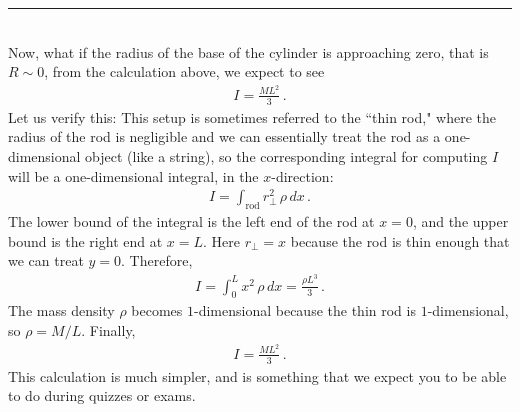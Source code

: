 \documentclass[11pt]{article}
\begin{document}
\noindent\rule{8cm}{0.4pt}\\
Now, what if the radius of the base of the cylinder is approaching zero, that is $R \sim 0$, from the calculation above, we expect to see
\begin{align*}
I = \frac{ML^2}{3}\,.
\end{align*}
Let us verify this: This setup is sometimes referred to the ``thin rod," where the radius of the rod is negligible and we can essentially treat the rod as a one-dimensional object (like a string), so the corresponding integral for computing $I$ will be a one-dimensional integral, in the $x$-direction:
\begin{align*}
I = \int_{\text{rod}} r_{\perp}^2 \,\rho\, dx\,.
\end{align*}
The lower bound of the integral is the left end of the rod at $x = 0$, and the upper bound is the right end at $x = L$. Here $r_\perp = x$ because the rod is thin enough that we can treat $y = 0$. Therefore, 
\begin{align*}
I= \int_{0}^L x^2 \, \rho \,  dx = \frac{\rho L^3}{3}\,.
\end{align*}
The mass density $\rho$ becomes $1$-dimensional because the thin rod is $1$-dimensional, so $\rho = M/L$. Finally, 
\begin{align*}
I = \frac{ML^2}{3}\,.
\end{align*}
This calculation is much simpler, and is something that we expect you to be able to do during quizzes or exams. 
\end{document}
